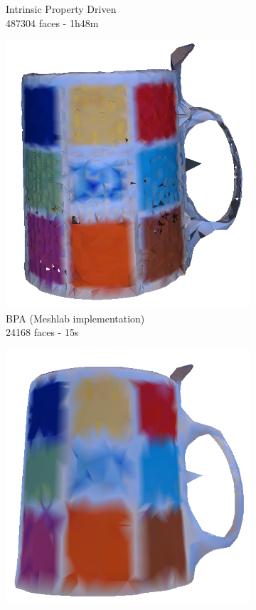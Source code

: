 \documentclass[a4paper,10pt]{report}
\begin{document}
\begin{figure}[h!]
\begin{subfigure}[b]{0.3\textwidth}
        \caption{Intrinsic Property Driven\\487304 faces - 1h48m}
    \end{subfigure}
    \begin{subfigure}[b]{0.3\textwidth}
	    \includegraphics[width=\textwidth]{results/nodp-bpameshlab.png}
        \caption{BPA (Meshlab implementation)\\24168 faces - 15s}
    \end{subfigure}
    \begin{subfigure}[b]{0.3\textwidth}
	    \includegraphics[width=\textwidth]{results/nodp-delaunay.png}

\end{subfigure}
\end{figure}
\end{document}

